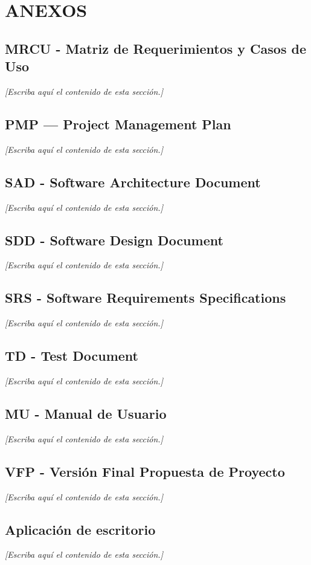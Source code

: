 \documentclass[12pt,letterpaper,oneside]{article}
\newcommand{\pendiente}[1][Escriba aquí el contenido de esta sección.]{%
  {\color{gray!75}\itshape [#1]}\par}
\newcommand{\capitulo}[1]{\clearpage\section{#1}}
\begin{document}
\capitulo{ANEXOS}

\subsection{MRCU - Matriz de Requerimientos y Casos de Uso}
\pendiente

\subsection{PMP — Project Management Plan}
\pendiente

\subsection{SAD - Software Architecture Document}
\pendiente

\subsection{SDD - Software Design Document}
\pendiente

\subsection{SRS - Software Requirements Specifications}
\pendiente

\subsection{TD - Test Document}
\pendiente

\subsection{MU - Manual de Usuario}
\pendiente

\subsection{VFP - Versión Final Propuesta de Proyecto}
\pendiente

\subsection{Aplicación de escritorio}
\pendiente
\end{document}
